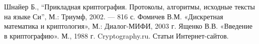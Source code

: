 \begin{thebibliography}{1}
 Шнайер Б., ``Прикладная криптография. Протоколы, алгоритмы, исходные тексты на языке Си'', М.: Триумф, 2002. — 816 с.
 Фомичев В.М. «Дискретная математика и криптология», М.: Диалог-МИФИ, 2003 г.
 Ященко В.В. «Введение в криптографию». М., 1988 г.
 Cryptography.ru. Статьи Интернет-сайтов. 
\end{thebibliography}
